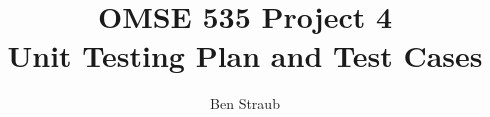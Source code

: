 \documentclass[11pt]{article}
\begin{document}
\title{OMSE 535 Project 4 \\ Unit Testing Plan and Test Cases}
\author{Ben Straub}
\maketitle
\end{document}

